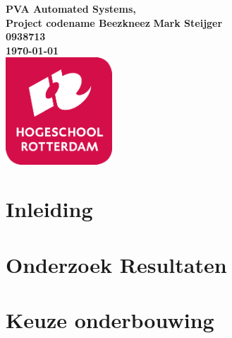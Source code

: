 \documentclass{article}
\begin{document}
\sffamily
\begin{titlepage}
  \centering
    \vfill
    {\bfseries\Huge
      PVA Automated Systems, \\
      Project codename Beezkneez
        \vskip2cm
      }
      {\bfseries\Large
        Mark Steijger\\
      }
      {
        \bfseries\normalsize
        0938713\\
        \vskip1cm
        \today\\
    }    
    \vfill
    \includegraphics[width=4cm]{logohr.png} %
    \vfill
    \vfill
\end{titlepage}
\newpage
\tableofcontents

\newpage
\section{Inleiding}


\newpage
\section{Onderzoek Resultaten}




\newpage
\section{Keuze onderbouwing}





\newpage


\end{document}
